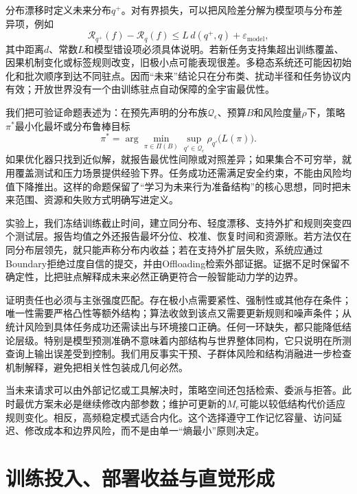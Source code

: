 分布漂移时定义未来分布$q^+$。对有界损失，可以把风险差分解为模型项与分布差异项，例如
\begin{equation}
\mathcal R_{q^+}(f)-\mathcal R_q(f)
\leq L\,d(q^+,q)+\varepsilon_{\mathrm{model}},
\end{equation}
其中距离$d$、常数$L$和模型错设项必须具体说明。若新任务支持集超出训练覆盖、因果机制变化或标签规则改变，旧极小点可能表现很差。多稳态系统还可能因初始化和批次顺序到达不同驻点。因而“未来”结论只在分布类、扰动半径和任务协议内有效；开放世界没有一个由训练驻点自动保障的全宇宙最优性。

我们把可验证命题表述为：在预先声明的分布族$\mathcal Q_\epsilon$、预算$B$和风险度量$\rho$下，策略$\pi^*$最小化最坏或分布鲁棒目标
\begin{equation}
\pi^*=\arg\min_{\pi\in\Pi(B)}\sup_{q'\in\mathcal Q_\epsilon}
\rho_{q'}\bigl(L(\pi)\bigr).
\end{equation}
如果优化器只找到近似解，就报告最优性间隙或对照差异；如果集合不可穷举，就用覆盖测试和压力场景提供经验下界。任务成功还需满足安全约束，不能由风险均值下降推出。这样的命题保留了“学习为未来行为准备结构”的核心思想，同时把未来范围、资源和失败方式明确写进定义。

实验上，我们冻结训练截止时间，建立同分布、轻度漂移、支持外扩和规则突变四个测试层。报告均值之外还报告最坏分位、校准、恢复时间和资源账。若方法仅在同分布层领先，就只能声称分布内收益；若在支持外扩层失败，系统应通过Boundary拒绝过度自信的提交，并由Offloading检索外部证据。证据不足时保留不确定性，比把驻点解释成未来必然正确更符合一般智能动力学的边界。

证明责任也必须与主张强度匹配。存在极小点需要紧性、强制性或其他存在条件；唯一性需要严格凸性等额外结构；算法收敛到该点又需要更新规则和噪声条件；从统计风险到具体任务成功还需读出与环境接口正确。任何一环缺失，都只能降低结论层级。特别是模型预测准确不意味着内部结构与世界整体同构，它只说明在所测查询上输出误差受到控制。我们用反事实干预、子群体风险和结构消融进一步检查机制解释，避免把相关性包装成几何必然。

当未来请求可以由外部记忆或工具解决时，策略空间还包括检索、委派与拒答。此时最优方案未必是继续修改内部参数；维护可更新的$M_e$可能以较低结构代价适应规则变化。相反，高频稳定模式适合内化。这个选择遵守工作记忆容量、访问延迟、修改成本和边界风险，而不是由单一“熵最小”原则决定。

\section{训练投入、部署收益与直觉形成}
\label{sec:physical_consequences}

